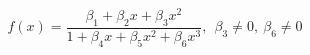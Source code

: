 

\[
f(x) = \frac{\beta_1 + \beta_2x + \beta_3x^2}{1 + \beta_4x + \beta_5x^2 + \beta_6x^3}, \ \ \beta_3 \neq 0, \ \beta_6 \neq 0
\]


